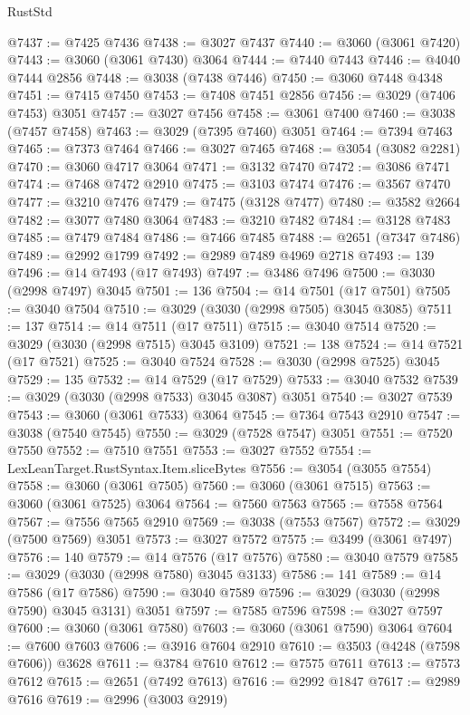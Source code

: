 \begin{lexlean}{RustStd}
\begin{coremodule}
@7437 := @7425 @7436
@7438 := @3027 @7437
@7440 := @3060 (@3061 @7420)
@7443 := @3060 (@3061 @7430) @3064
@7444 := @7440 @7443
@7446 := @4040 @7444 @2856
@7448 := @3038 (@7438 @7446)
@7450 := @3060 @7448 @4348
@7451 := @7415 @7450
@7453 := @7408 @7451 @2856
@7456 := @3029 (@7406 @7453) @3051
@7457 := @3027 @7456
@7458 := @3061 @7400
@7460 := @3038 (@7457 @7458)
@7463 := @3029 (@7395 @7460) @3051
@7464 := @7394 @7463
@7465 := @7373 @7464
@7466 := @3027 @7465
@7468 := @3054 (@3082 @2281)
@7470 := @3060 @4717 @3064
@7471 := @3132 @7470
@7472 := @3086 @7471
@7474 := @7468 @7472 @2910
@7475 := @3103 @7474
@7476 := @3567 @7470
@7477 := @3210 @7476
@7479 := @7475 (@3128 @7477)
@7480 := @3582 @2664
@7482 := @3077 @7480 @3064
@7483 := @3210 @7482
@7484 := @3128 @7483
@7485 := @7479 @7484
@7486 := @7466 @7485
@7488 := @2651 (@7347 @7486)
@7489 := @2992 @1799
@7492 := @2989 @7489 @4969 @2718
@7493 := 139
@7496 := @14 @7493 (@17 @7493)
@7497 := @3486 @7496
@7500 := @3030 (@2998 @7497) @3045
@7501 := 136
@7504 := @14 @7501 (@17 @7501)
@7505 := @3040 @7504
@7510 := @3029 (@3030 (@2998 @7505) @3045 @3085)
@7511 := 137
@7514 := @14 @7511 (@17 @7511)
@7515 := @3040 @7514
@7520 := @3029 (@3030 (@2998 @7515) @3045 @3109)
@7521 := 138
@7524 := @14 @7521 (@17 @7521)
@7525 := @3040 @7524
@7528 := @3030 (@2998 @7525) @3045
@7529 := 135
@7532 := @14 @7529 (@17 @7529)
@7533 := @3040 @7532
@7539 := @3029 (@3030 (@2998 @7533) @3045 @3087) @3051
@7540 := @3027 @7539
@7543 := @3060 (@3061 @7533) @3064
@7545 := @7364 @7543 @2910
@7547 := @3038 (@7540 @7545)
@7550 := @3029 (@7528 @7547) @3051
@7551 := @7520 @7550
@7552 := @7510 @7551
@7553 := @3027 @7552
@7554 := LexLeanTarget.RustSyntax.Item.sliceBytes
@7556 := @3054 (@3055 @7554)
@7558 := @3060 (@3061 @7505)
@7560 := @3060 (@3061 @7515)
@7563 := @3060 (@3061 @7525) @3064
@7564 := @7560 @7563
@7565 := @7558 @7564
@7567 := @7556 @7565 @2910
@7569 := @3038 (@7553 @7567)
@7572 := @3029 (@7500 @7569) @3051
@7573 := @3027 @7572
@7575 := @3499 (@3061 @7497)
@7576 := 140
@7579 := @14 @7576 (@17 @7576)
@7580 := @3040 @7579
@7585 := @3029 (@3030 (@2998 @7580) @3045 @3133)
@7586 := 141
@7589 := @14 @7586 (@17 @7586)
@7590 := @3040 @7589
@7596 := @3029 (@3030 (@2998 @7590) @3045 @3131) @3051
@7597 := @7585 @7596
@7598 := @3027 @7597
@7600 := @3060 (@3061 @7580)
@7603 := @3060 (@3061 @7590) @3064
@7604 := @7600 @7603
@7606 := @3916 @7604 @2910
@7610 := @3503 (@4248 (@7598 @7606)) @3628
@7611 := @3784 @7610
@7612 := @7575 @7611
@7613 := @7573 @7612
@7615 := @2651 (@7492 @7613)
@7616 := @2992 @1847
@7617 := @2989 @7616
@7619 := @2996 (@3003 @2919)

\end{coremodule}
\end{lexlean}
